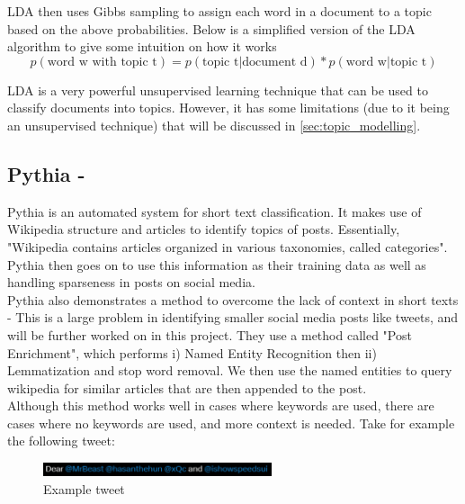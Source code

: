 LDA then uses Gibbs sampling to assign each word in a document to a topic based on the above probabilities. Below is a
simplified version of the LDA algorithm to give some intuition on how it works
\begin{equation}
    p(\text{word w with topic t}) = p(\text{topic t} \vert \text{document d}) * p(\text{word w} \vert \text{topic t})
\end{equation}

LDA is a very powerful unsupervised learning technique that can be used to classify documents into topics. However,
it has some limitations (due to it being an unsupervised technique) that will be discussed in \cref{sec:topic_modelling}.
\subsection{Pythia - \cite{Pythia}}
\label{sec:pythia}
Pythia is an automated system for short text classification. It makes use of Wikipedia structure and articles to identify
topics of posts.
Essentially, "Wikipedia contains articles organized in various taxonomies, called categories". Pythia then goes on to use
this information as their training data as well as handling sparseness in posts on social media.\\

Pythia also demonstrates a method to overcome the lack of context in short texts - This is a large problem in identifying
smaller social media posts like tweets, and will be further worked on in this project. They use a method called "Post Enrichment",
which performs i) Named Entity Recognition then ii) Lemmatization and stop word removal. We then use the named entities to query
wikipedia for similar articles that are then appended to the post.\\

Although this method works well in cases where keywords are used, there are cases where no keywords are used, and more context
is needed. Take for example the following tweet:
\newpage
\begin{figure}[htbp]
    \centering
    \includegraphics[width=0.6\textwidth]{../images/tweet-example2.png}
    \caption{Example tweet}
    \label{fig:tweet-example}
\end{figure}

